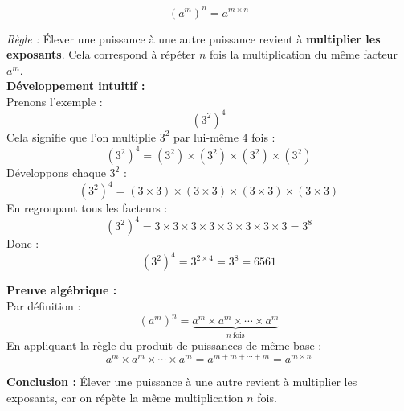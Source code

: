 \documentclass[11pt,a4paper]{article}
\newcommand{\rulebox}[3]{
\begin{tcolorbox}[colback=#1!10!white,colframe=#1!60!black,title=\textbf{#2}]
#3
\end{tcolorbox}
}
\begin{document}
\rulebox{orange}{Puissance d’une puissance}{
\[
(a^m)^n = a^{m\times n}
\]

\textit{Règle :}  
Élever une puissance à une autre puissance revient à \textbf{multiplier les exposants}.  
Cela correspond à répéter $n$ fois la multiplication du même facteur $a^m$.\\[0.3cm]

\textbf{Développement intuitif :}\\[0.2cm]
Prenons l’exemple :
\[
(3^2)^4
\]
Cela signifie que l’on multiplie $3^2$ par lui-même $4$ fois :
\[
(3^2)^4 = (3^2) \times (3^2) \times (3^2) \times (3^2)
\]
Développons chaque $3^2$ :
\[
(3^2)^4 = (3 \times 3) \times (3 \times 3) \times (3 \times 3) \times (3 \times 3)
\]
En regroupant tous les facteurs :
\[
(3^2)^4 = 3 \times 3 \times 3 \times 3 \times 3 \times 3 \times 3 \times 3 = 3^8
\]
Donc :
\[
(3^2)^4 = 3^{2\times4} = 3^8 = 6561
\]

\textbf{Preuve algébrique :}\\[0.2cm]
Par définition :
\[
(a^m)^n = \underbrace{a^m \times a^m \times \cdots \times a^m}_{n\ \text{fois}}
\]
En appliquant la règle du produit de puissances de même base :
\[
a^m \times a^m \times \cdots \times a^m = a^{m+m+\cdots+m} = a^{m\times n}
\]

\textbf{Conclusion :}  
Élever une puissance à une autre revient à multiplier les exposants, car on répète la même multiplication $n$ fois.
}
\end{document}
